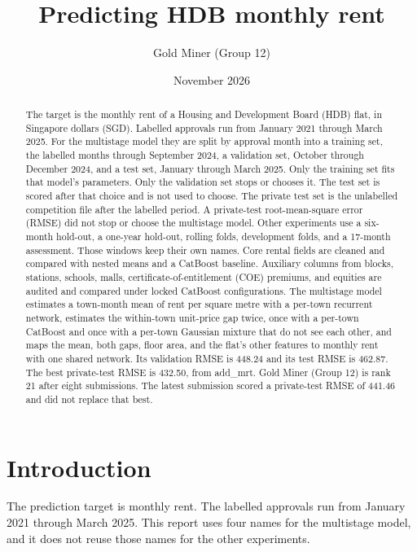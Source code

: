 \documentclass[11pt,a4paper]{article}
\title{Predicting HDB monthly rent}
\author{Gold Miner (Group 12)}
\date{November 2026}
\begin{document}
\maketitle

\begin{abstract}
The target is the monthly rent of a Housing and Development Board (HDB) flat, in Singapore dollars (SGD).
Labelled approvals run from January 2021 through March 2025.
For the multistage model they are split by approval month into a training set, the labelled months through September 2024, a validation set, October through December 2024, and a test set, January through March 2025.
Only the training set fits that model's parameters.
Only the validation set stops or chooses it.
The test set is scored after that choice and is not used to choose.
The private test set is the unlabelled competition file after the labelled period.
A private-test root-mean-square error (RMSE) did not stop or choose the multistage model.
Other experiments use a six-month hold-out, a one-year hold-out, rolling folds, development folds, and a 17-month assessment.
Those windows keep their own names.
Core rental fields are cleaned and compared with nested means and a CatBoost baseline.
Auxiliary columns from blocks, stations, schools, malls, certificate-of-entitlement (COE) premiums, and equities are audited and compared under locked CatBoost configurations.
The multistage model estimates a town-month mean of rent per square metre with a per-town recurrent network, estimates the within-town unit-price gap twice, once with a per-town CatBoost and once with a per-town Gaussian mixture that do not see each other, and maps the mean, both gaps, floor area, and the flat's other features to monthly rent with one shared network.
Its validation RMSE is 448.24 and its test RMSE is 462.87.
The best private-test RMSE is 432.50, from add\_mrt.
Gold Miner (Group 12) is rank 21 after eight submissions.
The latest submission scored a private-test RMSE of 441.46 and did not replace that best.
\end{abstract}

\section{Introduction}
\label{sec:intro}

The prediction target is monthly rent.
The labelled approvals run from January 2021 through March 2025.
This report uses four names for the multistage model, and it does not reuse those names for the other experiments.
\end{document}

